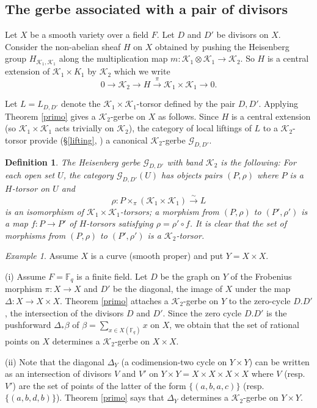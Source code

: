 \documentclass{amsart}
\numberwithin{equation}{subsection}
\newtheorem{definition}[theorem]{Definition}
\theoremstyle{remark}
\newtheorem{example}[theorem]{Example}
\theoremstyle{remark}
\newcommand{\too}{\longrightarrow}%
\newcommand{\cG}{\mathcal{G}}
\newcommand{\cK}{\mathcal{K}}
\begin{document}
 \subsection{The gerbe associated with a pair of divisors}\label{pairs} Let $X$ be a smooth variety over a field $F$. Let $D$ and $D'$ be divisors on $X$. Consider the non-abelian sheaf $H$ on $X$ 
obtained by pushing the Heisenberg group $H_{\cK_1, \cK_1}$ along the multiplication map $m: \cK_1\otimes \cK_1 \to \cK_2$. 
So $H$ is a central extension of $\cK_1 \times K_1$ by $\cK_2$ which we write
\begin{equation}\label{heisenbergk2}
  0 \too \cK_2 \too H \overset{\pi}{\too} \cK_1 \times \cK_1 \too 0.
\end{equation}

 Let $L = L_{D, D'}$ denote the $\cK_1 \times \cK_1$-torsor defined by the pair $D, D'$. Applying Theorem \ref{primo} gives a $\cK_2$-gerbe on $X$ as follows. Since $H$ is a central extension (so $\cK_1 \times \cK_1$ 
 acts trivially on $\cK_2$), the category of local liftings of $L$ to a $\cK_2$-torsor provide (\S \ref{lifting}, \cite[IV, 4.2.2]{Giraud}) a canonical $\cK_2$-gerbe $\cG_{D, D'}$. 
 \begin{definition}
   The Heisenberg gerbe $\cG_{D, D'}$ with band $\cK_2$ is the following: For each open set $U$, the category $\cG_{D, D'}(U)$ has objects pairs $(P, \rho)$ where $P$ is a $H$-torsor on $U$ and
   \begin{equation*}
     \rho\colon P \times_{\pi} (\cK_1 \times \cK_1) \overset{\sim}{\too} L
   \end{equation*}
   is an isomorphism of $\cK_1 \times \cK_1$-torsors; a morphism from $(P, \rho)$ to 
$(P', \rho')$ is a map $f: P \to P'$ of $H$-torsors satisfying $\rho = \rho'\circ f$. It is clear that the set of morphisms from $(P, \rho)$ to $(P', \rho')$ is a $\cK_2$-torsor.
\end{definition} 

\begin{example} Assume $X$ is a curve (smooth proper) and put $Y =X \times X$.

(i) Assume $F=\mathbb F_q$ is a finite field. Let $D$ be the graph on $Y$ of the Frobenius morphism $\pi: X \to X$ and $D'$ be the diagonal, the image of $X$ under the map $\Delta: X \to X \times X$. Theorem \ref{primo} attaches a $\cK_2$-gerbe on $Y$ to the zero-cycle $D.D'$, the intersection of the divisors $D$ and $D'$. Since the zero cycle $D.D'$ is the pushforward $\Delta_{*} \beta$ of  $\beta= \displaystyle\sum_{x\in X(\mathbb F_q)} x$ on $X$, we obtain that the set of rational points on $X$ determines a $\cK_2$-gerbe on $X \times X$. 

(ii) Note that the diagonal $\Delta_Y$ (a codimension-two cycle on $Y \times Y$) can be written as an intersection of divisors $V$ and $V'$ on $Y\times Y = X \times X\times X \times X$ where $V$ (resp. $V'$) are the set of points of the latter of the form  $\{(a,b,a,c)\}$ (resp. $\{(a,b,d,b)\}$).  Theorem \ref{primo} says that $\Delta_Y$ determines a $\cK_2$-gerbe on $Y\times Y$. 
\end{example}
\end{document}

